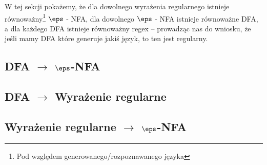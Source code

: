 W tej sekcji pokażemy, że dla dowolnego wyrażenia regularnego istnieje równoważny\footnote{Pod względem generowanego/rozpoznawanego języka} \( \eps \) - NFA, dla dowolnego \( \eps \) - NFA istnieje równoważne DFA, a dla każdego DFA istnieje równoważny regex -- prowadząc nas do wniosku, że jeśli mamy DFA które generuje jakiś język, to ten jest regularny.

\subsection{DFA \texorpdfstring{\(\rightarrow\)}{na} \texorpdfstring{\(\eps\)}{epsilon}-NFA}


\subsection{DFA \texorpdfstring{\( \rightarrow \)}{na} Wyrażenie regularne}


\subsection{Wyrażenie regularne \texorpdfstring{\( \rightarrow \)}{na} \texorpdfstring{\(\eps\)}{epsilon}-NFA}

